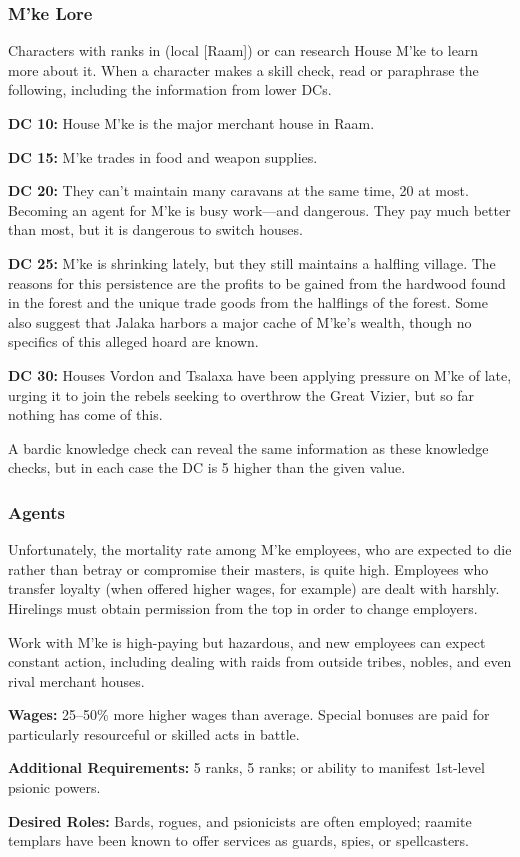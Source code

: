 \subsubsection{M'ke Lore}
Characters with ranks in  (local [Raam]) or  can research House M'ke to learn more about it. When a character makes a skill check, read or paraphrase the following, including the information from lower DCs.

\textbf{DC 10:} House M'ke is the major merchant house in Raam.

\textbf{DC 15:} M'ke trades in food and weapon supplies.

\textbf{DC 20:} They can't maintain many caravans at the same time, 20 at most. Becoming an agent for M'ke is busy work---and dangerous. They pay much better than most, but it is dangerous to switch houses.

\textbf{DC 25:} M'ke is shrinking lately, but they still maintains a halfling village. The reasons for this persistence are the profits to be gained from the hardwood found in the forest and the unique trade goods from the halflings of the forest. Some also suggest that Jalaka harbors a major cache of M'ke's wealth, though no specifics of this alleged hoard are known.

\textbf{DC 30:} Houses Vordon and Tsalaxa have been applying pressure on M'ke of late, urging it to join the rebels seeking to overthrow the Great Vizier, but so far nothing has come of this.

A bardic knowledge check can reveal the same information as these knowledge checks, but in each case the DC is 5 higher than the given value.

\subsubsection{Agents}
Unfortunately, the mortality rate among M'ke employees, who are expected to die rather than betray or compromise their masters, is quite high. Employees who transfer loyalty (when offered higher wages, for example) are dealt with harshly. Hirelings must obtain permission from the top in order to change employers.

Work with M'ke is high-paying but hazardous, and new employees can expect constant action, including dealing with raids from outside tribes, nobles, and even rival merchant houses.

\textbf{Wages:} 25--50\% more higher wages than average. Special bonuses are paid for particularly resourceful or skilled acts in battle.

\textbf{Additional Requirements:}  5 ranks,  5 ranks; or ability to manifest 1st-level psionic powers.

\textbf{Desired Roles:} Bards, rogues, and psionicists are often employed; raamite templars have been known to offer services as guards, spies, or spellcasters.